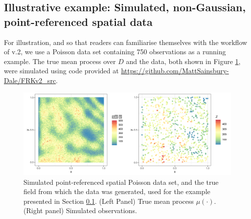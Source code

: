 \documentclass[article]{jss}
\newcommand{\class}[1]{`\code{#1}'}
\begin{document}
\subsection{Illustrative example: Simulated, non-Gaussian, point-referenced spatial data}\label{sec:03-01:Poisson}






For illustration, and so that readers can familiarise themselves with the workflow of  v.2, we use a Poisson data set containing 750 observations as a running example. 
The true mean process over $D$ and the data, both shown in Figure \ref{fig:Poisson_true_and_Z}, were simulated using code provided at \url{https://github.com/MattSainsbury-Dale/FRKv2_src}.

\begin{figure}[t!]
    \centering
    \includegraphics[width = 0.75\linewidth]{img/Poisson_sim_true_process_and_data.png}
    \caption{Simulated point-referenced spatial Poisson data set, and the true field from which the data was generated, used for the example presented in Section \ref{sec:03-01:Poisson}. (Left Panel) True mean process $\mu(\cdot)$. (Right panel) Simulated observations.  
}   
  \label{fig:Poisson_true_and_Z}
\end{figure}
\end{document}
